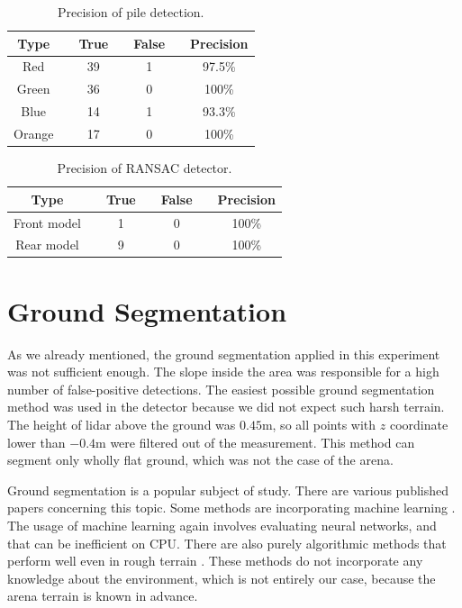 \begin{table}[H]
	\centering
	\begin{tabular}{ccccccc}
		\toprule
		Type &\quad& True &\quad& False &\quad& Precision \\
		\midrule
		Red &\quad& 39 &\quad& 1 &\quad& 97.5\% \\
		Green &\quad& 36 &\quad& 0 &\quad& 100\% \\
		Blue &\quad& 14 &\quad& 1 &\quad& 93.3\% \\
		Orange &\quad& 17 &\quad& 0 &\quad& 100\% \\
		\bottomrule
	\end{tabular}
	\caption{Precision of pile detection.}
	\label{tab:pile_precision}
\end{table}


\begin{table}[H]
	\centering
	\begin{tabular}{ccccccc}
		\toprule
		Type &\quad& True &\quad& False &\quad& Precision \\
		\midrule
		Front model &\quad& 1 &\quad& 0 &\quad& 100\% \\
		Rear model &\quad& 9 &\quad& 0 &\quad& 100\% \\
		\bottomrule
	\end{tabular}
	\caption{Precision of RANSAC detector.}
	\label{tab:RANSAC_precision}
\end{table}


\section{Ground Segmentation}
As we already mentioned, the ground segmentation applied in this experiment was not sufficient enough. The slope inside the area was responsible for a high number of false-positive detections. The easiest possible ground segmentation method was used in the detector because we did not expect such harsh terrain. The height of lidar above the ground was $0.45$m, so all points with $z$ coordinate lower than $-0.4$m were filtered out of the measurement. This method can segment only wholly flat ground, which was not the case of the arena.

Ground segmentation is a popular subject of study. There are various published papers concerning this topic. Some methods are incorporating machine learning \cite{velas2018}. The usage of machine learning again involves evaluating neural networks, and that can be inefficient on CPU. There are also purely algorithmic methods that perform well even in rough terrain \cite{phuong2019}. These methods do not incorporate any knowledge about the environment, which is not entirely our case, because the arena terrain is known in advance.

